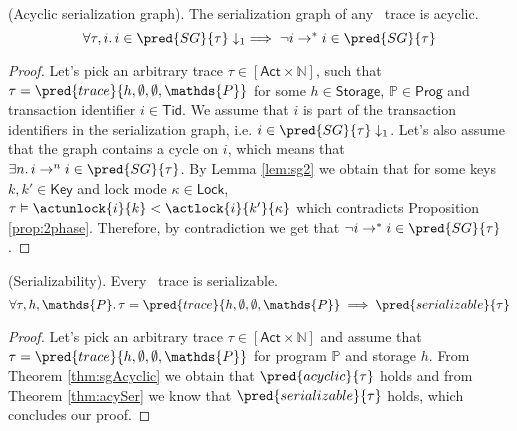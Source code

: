 \begin{thm}
	\label{thm:sgAcyclic}
	(Acyclic serialization graph).
	The serialization graph of any \tpl\ trace is acyclic.
	\[
	\forall \tau, i \ldotp i \in \pred{SG}{\tau} \downarrow_1 \implies \lnot i \rightarrow^* i \in \pred{SG}{\tau}
	\]
	\begin{proof}
	Let's pick an arbitrary trace $\tau \in [\mathsf{Act} \times \mathds{N}]$, such that $\tau = \pred{trace}{h, \emptyset, \emptyset, \mathds{P}}$ for some $h \in \mathsf{Storage}$, $\mathds{P} \in \mathsf{Prog}$ and transaction identifier $i \in \mathsf{Tid}$. We assume that $i$ is part of the transaction identifiers in the serialization graph, i.e. $i \in \pred{SG}{\tau} \downarrow_1$. Let's also assume that the graph contains a cycle on $i$, which means that $\exists n \ldotp i \rightarrow^n i \in \pred{SG}{\tau}$. By Lemma \ref{lem:sg2} we obtain that for some keys $k, k' \in \mathsf{Key}$ and lock mode $\kappa \in \mathsf{Lock}$, $\tau \vDash \actunlock{i}{k} < \actlock{i}{k'}{\kappa}$ which contradicts Proposition \ref{prop:2phase}. Therefore, by contradiction we get that $\lnot i \rightarrow^* i \in \pred{SG}{\tau}$.
	\end{proof}
\end{thm}

\begin{thm}
	(Serializability).
	Every \tpl\ trace is serializable.
	\[
		\forall \tau, h, \mathds{P} \ldotp \tau = \pred{trace}{h, \emptyset, \emptyset, \mathds{P}} \implies \pred{serializable}{\tau}
	\]
	\begin{proof}
	Let's pick an arbitrary trace $\tau \in [\mathsf{Act} \times \mathds{N}]$ and assume that $\tau = \pred{trace}{h, \emptyset, \emptyset, \mathds{P}}$ for program $\mathds{P}$ and storage $h$. From Theorem \ref{thm:sgAcyclic} we obtain that $\pred{acyclic}{\tau}$ holds and from Theorem \ref{thm:acySer} we know that $\pred{serializable}{\tau}$ holds, which concludes our proof.
	\end{proof}
\end{thm}